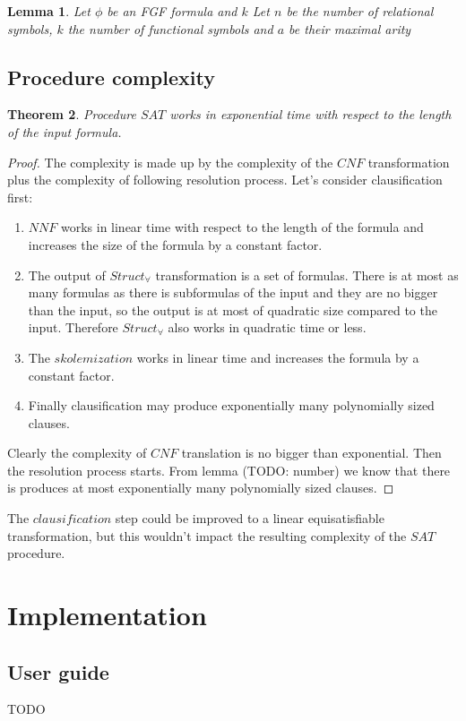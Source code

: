 \documentclass[english, shortabstract]{iithesis}
\theoremstyle{definition} \newtheorem{definition}{Definition}[chapter]
\theoremstyle{remark} \newtheorem{remark}[definition]{Observation}
\theoremstyle{plain} \newtheorem{theorem}[definition]{Theorem}
\theoremstyle{plain} \newtheorem{lemma}[definition]{Lemma}
\begin{document}
\begin{lemma}
Let $\phi$ be an FGF formula and $k$ 
Let $n$ be the number of relational symbols,
$k$ the number of functional symbols and $a$ be their maximal arity
\end{lemma}

\section{Procedure complexity}

\begin{theorem}
Procedure $SAT$ works in exponential time with respect to the length of the input formula. 
\end{theorem}

\begin{proof}
The complexity is made up by the complexity of the $CNF$ transformation plus the complexity of following resolution process.
Let's consider clausification first:
\begin{enumerate}
    \item $NNF$ works in linear time with respect to the length of the formula and increases the size of the formula by a constant factor.
    \item The output of $Struct_{\forall}$ transformation is a set of formulas. There is at most as many formulas as there is 
    subformulas of the input and they are no bigger than the input, so the output is at most of quadratic size compared to the input.
    Therefore $Struct_\forall$ also works in quadratic time or less.
    \item The $skolemization$ works in linear time and increases the formula by a constant factor.
    \item Finally clausification may produce exponentially many polynomially sized clauses.
\end{enumerate}
Clearly the complexity of $CNF$ translation is no bigger than exponential.
Then the resolution process starts.
From lemma (TODO: number) we know that there is  produces at most exponentially many polynomially sized clauses. 
\end{proof}

The $clausification$ step could be improved to a linear equisatisfiable transformation,
but this wouldn't impact the resulting complexity of the $SAT$ procedure.

\chapter{Implementation}

\section{User guide}

TODO


\end{document}
